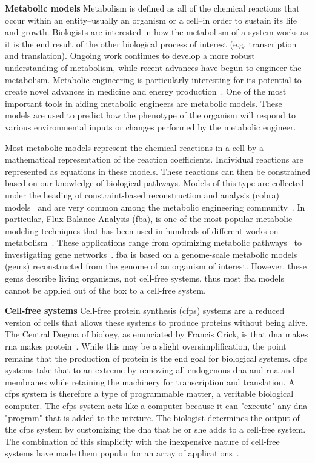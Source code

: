 \textbf{Metabolic models}
Metabolism is defined as all of the chemical reactions that occur within an entity--usually an organism or a cell--in order to sustain its life and growth.
Biologists are interested in how the metabolism of a system works as it is the end result of the other biological process of interest (e.g. transcription and translation).
Ongoing work continues to develop a more robust understanding of metabolism, while recent advances have begun to engineer the metabolism. 
Metabolic engineering is particularly interesting for its potential to create novel advances in medicine and energy production~\cite{keasling2012synthetic}.
One of the most important tools in aiding metabolic engineers are metabolic models.
These models are used to predict how the phenotype of the organism will respond to various environmental inputs or changes performed by the metabolic engineer.

Most metabolic models represent the chemical reactions in a cell by a mathematical representation of the reaction coefficients.
Individual reactions are represented as equations in these models.
These reactions can then be constrained based on our knowledge of biological pathways.
Models of this type are collected under the heading of constraint-based reconstruction and analysis (\gls{cobra}) models~\cite{schellenberger2011quantitative} and are very common among the metabolic engineering community~\cite{orth2010flux}.
In particular, Flux Balance Analysis (\gls{fba}), is one of the most popular metabolic modeling techniques that has been used in hundreds of different works on metabolism~\cite{feist2008growing}.
These applications range from optimizing metabolic pathways~\cite{almaas2004global} to investigating gene networks~\cite{shlomi2007genome}.
\gls{fba} is based on a genome-scale metabolic models (\glspl{gem}) reconstructed from the genome of an organism of interest.
However, these \glspl{gem} describe living organisms, not cell-free systems, thus most \gls{fba} models cannot be applied out of the box to a cell-free system.

\textbf{Cell-free systems}
Cell-free protein synthesis (\gls{cfps}) systems are a reduced version of cells that allows these systems to produce proteins without being alive.
The Central Dogma of biology, as enunciated by Francis Crick, is that \gls{dna} makes \gls{rna} makes protein~\cite{crick1970central}.
While this may be a slight oversimplification, the point remains that the production of protein is the end goal for biological systems.
\gls{cfps} systems take that to an extreme by removing all endogenous \gls{dna} and \gls{rna} and membranes while retaining the machinery for transcription and translation.
A \gls{cfps} system is therefore a type of programmable matter, a veritable biological computer.
The \gls{cfps} system acts like a computer because it can "execute" any \gls{dna} "program" that is added to the mixture.
The biologist determines the output of the \gls{cfps} system by customizing the \gls{dna} that he or she adds to a cell-free system.
The combination of this simplicity with the inexpensive nature of cell-free systems have made them popular for an array of applications~\cite{hodgman2012cell, rollin2013new, carlson2012cell}.

